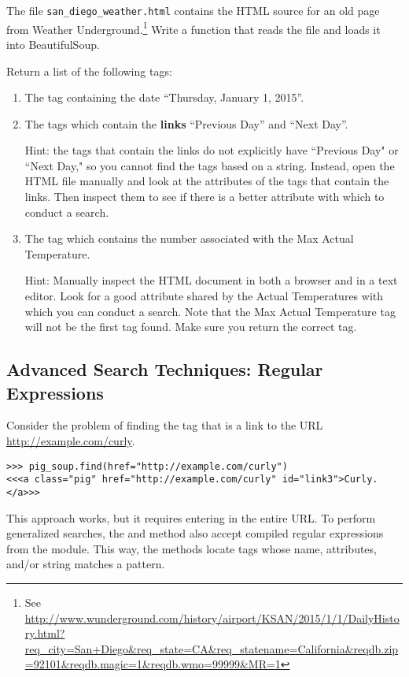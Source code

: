 \begin{problem}
The file \texttt{san\_diego\_weather.html} contains the HTML source for an old page from Weather Underground.\footnote{See \url{http://www.wunderground.com/history/airport/KSAN/2015/1/1/DailyHistory.html?req_city=San+Diego&req_state=CA&req_statename=California&reqdb.zip=92101&reqdb.magic=1&reqdb.wmo=99999&MR=1}}
Write a function that reads the file and loads it into BeautifulSoup.

Return a list of the following tags:
\begin{enumerate}
\item The tag containing the date ``Thursday, January 1, 2015''.
\item The tags which contain the \textbf{links} ``Previous Day'' and ``Next Day''. 

Hint: the tags that contain the links do not explicitly have ``Previous Day" or ``Next Day," so you cannot find the tags based on a string. Instead, open the HTML file manually and look at the attributes of the tags that contain the links. Then inspect them to see if there is a better attribute with which to conduct a search.
\item The tag which contains the number associated with the Max Actual Temperature.

Hint: Manually inspect the HTML document in both a browser and in a text editor. Look for a good attribute shared by the Actual Temperatures with which you can conduct a search. Note that the Max Actual Temperature tag will not be the first tag found. Make sure you return the correct tag.
\end{enumerate}
\end{problem}

\subsection*{Advanced Search Techniques: Regular Expressions} %

Consider the problem of finding the tag that is a link to the URL \url{http://example.com/curly}.

\begin{lstlisting}
>>> pig_soup.find(href="http://example.com/curly")
<<<a class="pig" href="http://example.com/curly" id="link3">Curly.</a>>>
\end{lstlisting}

This approach works, but it requires entering in the entire URL.
To perform generalized searches, the  and  method also accept compiled regular expressions from the  module.
This way, the methods locate tags whose name, attributes, and/or string matches a pattern.

